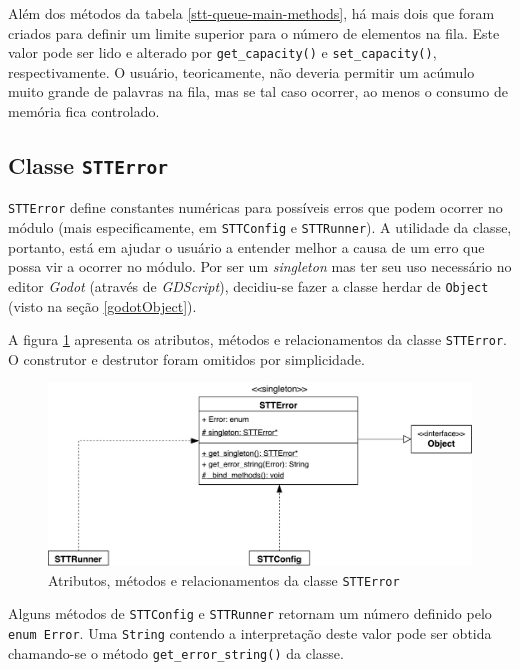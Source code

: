 Além dos métodos da tabela \ref{stt-queue-main-methods}, há mais dois que foram criados para definir um limite superior para o número de elementos na fila. Este valor pode ser lido e alterado por \texttt{get\_capacity()} e \texttt{set\_capacity()}, respectivamente. O usuário, teoricamente, não deveria permitir um acúmulo muito grande de palavras na fila, mas se tal caso ocorrer, ao menos o consumo de memória fica controlado.


\subsection{Classe \texttt{STTError}}

\texttt{STTError} define constantes numéricas para possíveis erros que podem ocorrer no módulo (mais especificamente, em \texttt{STTConfig} e \texttt{STTRunner}). A utilidade da classe, portanto, está em ajudar o usuário a entender melhor a causa de um erro que possa vir a ocorrer no módulo. Por ser um \textit{singleton} mas ter seu uso necessário no editor \textit{Godot} (através de \textit{GDScript}), decidiu-se fazer a classe herdar de \texttt{Object} (visto na seção \ref{godotObject}).

A figura \ref{stt-error-diagram} apresenta os atributos, métodos e relacionamentos da classe \texttt{STTError}. O construtor e destrutor foram omitidos por simplicidade.

\begin{figure}[H]
  \centering
  \includegraphics[width=.9\textwidth]{image/stt-error.pdf}
  \caption{Atributos, métodos e relacionamentos da classe \texttt{STTError}}
  \label{stt-error-diagram}
\end{figure}

Alguns métodos de \texttt{STTConfig} e \texttt{STTRunner} retornam um número definido pelo \texttt{enum Error}. Uma \texttt{String} contendo a interpretação deste valor pode ser obtida chamando-se o método \texttt{get\_error\_string()} da classe.

